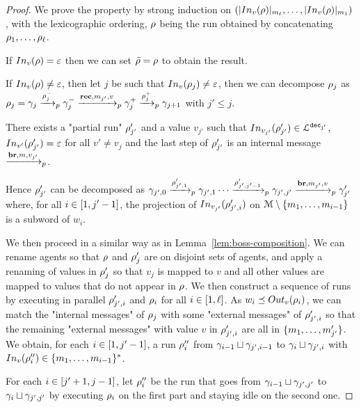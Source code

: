 \begin{proof}
	
	We prove the property by strong induction on $(\size{\vinput{v}{\run}}_{m_\ell}, \ldots, \size{\vinput{v}{\run}}_{m_1})$, with the lexicographic ordering, $\rho$ being the run obtained by concatenating $\rho_1, \ldots, \rho_\ell$.
	
	If $\vinput{v}{\run} = \epsilon$ then we can set $\Tilde{\rho} = \rho$ to obtain the result.
	
	If $\vinput{v}{\run} \neq \epsilon$, then let $j$ be such that $\vinput{v}{\run_j} \neq \epsilon$, then we can decompose $\rho_j$ as $\rho_j = \gamma_{j} \xrightarrow{\rho_j^-}_{p} \gamma_j^- \xrightarrow{\textbf{rec}, m_{j'}, v}_{p} \gamma_j^+ \xrightarrow{\rho_j^+}_{p} \gamma_{j+1}$ with $j'\leq j$. 
	
	There exists a "partial run" $\rho'_{j'}$ and a value $v_{j'}$ such that $\vinput{v_{j'}}{\run'_{j'}} \in \langdec{\decsymb_{j'}}$,  $\vinput{v'}{\run'_{j'}} = \varepsilon$ for all $v' \neq v_j$  and the last step of $\rho'_{j'}$ is an internal message $\xrightarrow{\textbf{br}, m, v_{j'}}_{p}$.
	
	Hence $\rho'_{j'}$ can be decomposed as $\gamma_{{j'},0} \xrightarrow{\rho_{{j'},1}'}_{p} \gamma_{{j'},1} \cdots \xrightarrow{\rho_{{j'},j'-1}'}_{p} \gamma_{{j'},j'} \xrightarrow{\textbf{br}, m_{j'}, v}_{p} \gamma'_{j'}$ where, for all $i \in [1,j'-1]$, the projection of $\vinput{v_{j'}}{\run_{{j'},i}'}$ on ${\mathcal{M}\setminus\{m_1, \ldots, m_{{i}-1}\}}$ is a subword of $w_i$.
	
	We then proceed in a similar way as in Lemma~\ref{lem:boss-composition}.
	We can rename agents so that $\rho$ and $\rho'_j$ are on disjoint sets of agents, and apply a renaming of values in $\rho_j'$ so that $v_j$ is mapped to $v$ and all other values are mapped to values that do not appear in $\rho$.
	We then construct a sequence of runs by executing in parallel $\rho_{j',i}'$ and $\rho_i$ for all $i\in[1,\ell]$. As $w_i \subword \voutput{v}{\run_i}$, we can match the "internal messages" of $\rho_j$ with some "external messages" of $\rho'_{j',i}$ so that the remaining "external messages" with value $v$ in $\rho'_{j',i}$ are all in $\{m_1, \ldots, m'_{j'}\}$. 
	We obtain, for each $i \in [1,j'-1]$, a run $\rho''_i$ from $\gamma_{i-1} \sqcup \gamma_{j', i-1}$ to $\gamma_{i} \sqcup \gamma_{j', i}$ with $\vinput{v}{\run''_i} \in \set{m_1, \ldots, m_{i-1}}^*$. 
	
	For each $i \in [j'+1,j-1]$, let $\rho''_i$ be the run that goes from $\gamma_{i-1} \sqcup \gamma_{j', j'}$ to $\gamma_{i} \sqcup \gamma_{j', j'}$ by executing $\rho_i$ on the first part and staying idle on the second one.
	

\end{proof}
